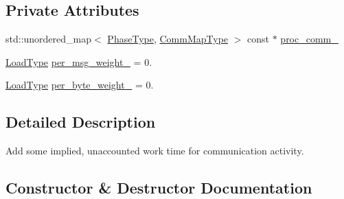 \subsection*{Private Attributes}
\begin{DoxyCompactItemize}
\item 
std\+::unordered\+\_\+map$<$ \hyperlink{namespacevt_a46ce6733d5cdbd735d561b7b4029f6d7}{Phase\+Type}, \hyperlink{namespacevt_1_1vrt_1_1collection_1_1balance_a01ee1fb0ae2da1d2ab7fdca3be9ae351}{Comm\+Map\+Type} $>$ const  $\ast$ \hyperlink{structvt_1_1vrt_1_1collection_1_1balance_1_1_comm_overhead_a6c5e0954d01ac8c05a44dfabdc053e0e}{proc\+\_\+comm\+\_\+}
\item 
\hyperlink{namespacevt_a8fb51741340b87d7aaee0bef60e9896b}{Load\+Type} \hyperlink{structvt_1_1vrt_1_1collection_1_1balance_1_1_comm_overhead_addb20b685e8319db616934d8ca7a12f5}{per\+\_\+msg\+\_\+weight\+\_\+} = 0.
\item 
\hyperlink{namespacevt_a8fb51741340b87d7aaee0bef60e9896b}{Load\+Type} \hyperlink{structvt_1_1vrt_1_1collection_1_1balance_1_1_comm_overhead_a7ea82599681be029e50f056d391bd739}{per\+\_\+byte\+\_\+weight\+\_\+} = 0.
\end{DoxyCompactItemize}


\subsection{Detailed Description}
Add some implied, unaccounted work time for communication activity. 

\subsection{Constructor \& Destructor Documentation}
\mbox{\label{structvt_1_1vrt_1_1collection_1_1balance_1_1_comm_overhead_a43c9a18c3436ed642061286b59e0d5b3}} 
